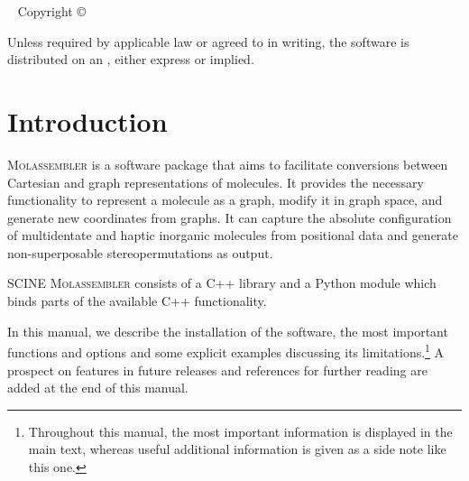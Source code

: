 \documentclass[]{tufte-book}
\title[SCINE Molassembler manual]{User Manual \vskip 0.5em
{\setlength{\parindent}{0pt} \Huge SCINE Molassembler 1.0.0}}
\author[The SCINE Molassembler Developers]{The SCINE Molassembler Developers:
\newline \noindent Jan-Grimo Sobez and Markus Reiher}
\newcommand{\monthyear}{%
  \ifcase\month\or January\or February\or March\or April\or May\or June\or
  July\or August\or September\or October\or November\or
  December\fi\space\number\year
}
\begin{document}
\setlength{\parindent}{0pt}

\frontmatter


\maketitle


\newpage
\begin{fullwidth}
~\vfill
\thispagestyle{empty}
\setlength{\parindent}{0pt}
\setlength{\parskip}{\baselineskip}
Copyright \copyright\ \the\year\ \thanklessauthor


\par{}

\par Unless required by applicable law or agreed to in writing, the software 
is distributed on an , either express or implied. 

\end{fullwidth}

\tableofcontents




\mainmatter

\let\cleardoublepage\clearpage
\chapter{Introduction}

\textsc{Molassembler} is a software package that aims to facilitate conversions
between Cartesian and graph representations of molecules. It provides the
necessary functionality to represent a molecule as a graph, modify it in graph
space, and generate new coordinates from graphs. It can capture the absolute
configuration of multidentate and haptic inorganic molecules from positional
data and generate non-superposable stereopermutations as output.

SCINE \textsc{Molassembler} consists of a C++ library and a Python module which
binds parts of the available C++ functionality. 

In this manual, we describe the installation of the software, the most important
functions and options and some explicit examples discussing its
limitations.\footnote{Throughout this manual, the most important information is
displayed in the main text, whereas useful additional information is given as a
side note like this one.} A prospect on features in future releases and
references for further reading are added at the end of this
manual.\enlargethispage{\baselineskip}
\end{document}
